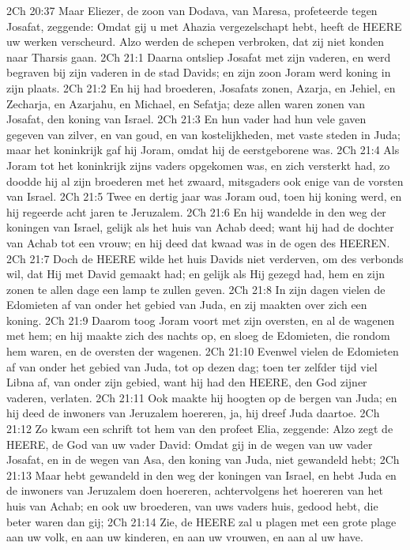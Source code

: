 2Ch 20:37  Maar Eliezer, de zoon van Dodava, van Maresa, profeteerde tegen Josafat, zeggende: Omdat gij u met Ahazia vergezelschapt hebt, heeft de HEERE uw werken verscheurd. Alzo werden de schepen verbroken, dat zij niet konden naar Tharsis gaan.
2Ch 21:1  Daarna ontsliep Josafat met zijn vaderen, en werd begraven bij zijn vaderen in de stad Davids; en zijn zoon Joram werd koning in zijn plaats.
2Ch 21:2  En hij had broederen, Josafats zonen, Azarja, en Jehiel, en Zecharja, en Azarjahu, en Michael, en Sefatja; deze allen waren zonen van Josafat, den koning van Israel.
2Ch 21:3  En hun vader had hun vele gaven gegeven van zilver, en van goud, en van kostelijkheden, met vaste steden in Juda; maar het koninkrijk gaf hij Joram, omdat hij de eerstgeborene was.
2Ch 21:4  Als Joram tot het koninkrijk zijns vaders opgekomen was, en zich versterkt had, zo doodde hij al zijn broederen met het zwaard, mitsgaders ook enige van de vorsten van Israel.
2Ch 21:5  Twee en dertig jaar was Joram oud, toen hij koning werd, en hij regeerde acht jaren te Jeruzalem.
2Ch 21:6  En hij wandelde in den weg der koningen van Israel, gelijk als het huis van Achab deed; want hij had de dochter van Achab tot een vrouw; en hij deed dat kwaad was in de ogen des HEEREN.
2Ch 21:7  Doch de HEERE wilde het huis Davids niet verderven, om des verbonds wil, dat Hij met David gemaakt had; en gelijk als Hij gezegd had, hem en zijn zonen te allen dage een lamp te zullen geven.
2Ch 21:8  In zijn dagen vielen de Edomieten af van onder het gebied van Juda, en zij maakten over zich een koning.
2Ch 21:9  Daarom toog Joram voort met zijn oversten, en al de wagenen met hem; en hij maakte zich des nachts op, en sloeg de Edomieten, die rondom hem waren, en de oversten der wagenen.
2Ch 21:10  Evenwel vielen de Edomieten af van onder het gebied van Juda, tot op dezen dag; toen ter zelfder tijd viel Libna af, van onder zijn gebied, want hij had den HEERE, den God zijner vaderen, verlaten.
2Ch 21:11  Ook maakte hij hoogten op de bergen van Juda; en hij deed de inwoners van Jeruzalem hoereren, ja, hij dreef Juda daartoe.
2Ch 21:12  Zo kwam een schrift tot hem van den profeet Elia, zeggende: Alzo zegt de HEERE, de God van uw vader David: Omdat gij in de wegen van uw vader Josafat, en in de wegen van Asa, den koning van Juda, niet gewandeld hebt;
2Ch 21:13  Maar hebt gewandeld in den weg der koningen van Israel, en hebt Juda en de inwoners van Jeruzalem doen hoereren, achtervolgens het hoereren van het huis van Achab; en ook uw broederen, van uws vaders huis, gedood hebt, die beter waren dan gij;
2Ch 21:14  Zie, de HEERE zal u plagen met een grote plage aan uw volk, en aan uw kinderen, en aan uw vrouwen, en aan al uw have.
